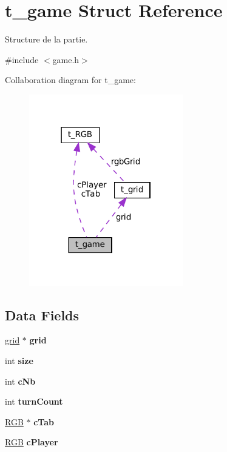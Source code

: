 \hypertarget{structt__game}{}\section{t\+\_\+game Struct Reference}
\label{structt__game}


Structure de la partie.  




{\ttfamily \#include $<$game.\+h$>$}



Collaboration diagram for t\+\_\+game\+:
\nopagebreak
\begin{figure}[H]
\begin{center}
\leavevmode
\includegraphics[width=190pt]{structt__game__coll__graph}
\end{center}
\end{figure}
\subsection*{Data Fields}
\begin{DoxyCompactItemize}
\item 
\mbox{\label{structt__game_a780e12a56f86fb3822d28afec44c2685}} 
\hyperlink{structt__grid}{grid} $\ast$ {\bfseries grid}
\item 
\mbox{\label{structt__game_a439227feff9d7f55384e8780cfc2eb82}} 
int {\bfseries size}
\item 
\mbox{\label{structt__game_a6a9496106a62415d229b9d57c6152a9b}} 
int {\bfseries c\+Nb}
\item 
\mbox{\label{structt__game_ab71773449e39dc6d45e68234a5ff47f2}} 
int {\bfseries turn\+Count}
\item 
\mbox{\label{structt__game_af5e477e41902666eec462e69916b547d}} 
\hyperlink{structt___r_g_b}{R\+GB} $\ast$ {\bfseries c\+Tab}
\item 
\mbox{\label{structt__game_a46ffdfb273ea74bbb8a3df3ae0f00897}} 
\hyperlink{structt___r_g_b}{R\+GB} {\bfseries c\+Player}
\end{DoxyCompactItemize}


